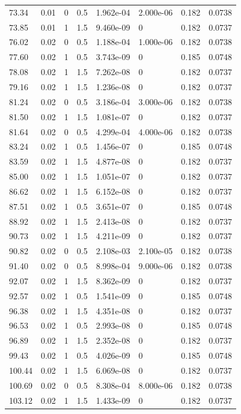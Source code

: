 \documentclass[preview]{standalone}
\begin{document}
{{{\begin{tabular}{L{1.2cm}C{1.2cm} C{0.3cm}C{0.5cm} C{1.4cm}C{1.4cm} C{1.4cm}C{1.4cm}}
  73.34  &  0.01  & 0     & 0.5 &  1.962e-04  & 2.000e-06  & 0.182 &  0.0738   \\ 
  73.85  &  0.01  & 1     & 1.5 &  9.460e-09  & 0  & 0.182 &  0.0737   \\ 
  76.02  &  0.02  & 0     & 0.5 &  1.188e-04  & 1.000e-06  & 0.182 &  0.0738   \\ 
  77.60  &  0.02  & 1     & 0.5 &  3.743e-09  & 0  & 0.185 &  0.0748   \\ 
  78.08  &  0.02  & 1     & 1.5 &  7.262e-08  & 0  & 0.182 &  0.0737   \\ 
  79.16  &  0.02  & 1     & 1.5 &  1.236e-08  & 0  & 0.182 &  0.0737   \\ 
  81.24  &  0.02  & 0     & 0.5 &  3.186e-04  & 3.000e-06  & 0.182 &  0.0738   \\ 
  81.50  &  0.02  & 1     & 1.5 &  1.081e-07  & 0  & 0.182 &  0.0737   \\ 
  81.64  &  0.02  & 0     & 0.5 &  4.299e-04  & 4.000e-06  & 0.182 &  0.0738   \\ 
  83.24  &  0.02  & 1     & 0.5 &  1.456e-07  & 0  & 0.185 &  0.0748   \\ 
  83.59  &  0.02  & 1     & 1.5 &  4.877e-08  & 0  & 0.182 &  0.0737   \\ 
  85.00  &  0.02  & 1     & 1.5 &  1.051e-07  & 0  & 0.182 &  0.0737   \\ 
  86.62  &  0.02  & 1     & 1.5 &  6.152e-08  & 0  & 0.182 &  0.0737   \\ 
  87.51  &  0.02  & 1     & 0.5 &  3.651e-07  & 0  & 0.185 &  0.0748   \\ 
  88.92  &  0.02  & 1     & 1.5 &  2.413e-08  & 0  & 0.182 &  0.0737   \\ 
  90.73  &  0.02  & 1     & 1.5 &  4.211e-09  & 0  & 0.182 &  0.0737   \\ 
  90.82  &  0.02  & 0     & 0.5 &  2.108e-03  & 2.100e-05  & 0.182 &  0.0738   \\ 
  91.40  &  0.02  & 0     & 0.5 &  8.998e-04  & 9.000e-06  & 0.182 &  0.0738   \\ 
  92.07  &  0.02  & 1     & 1.5 &  8.362e-09  & 0  & 0.182 &  0.0737   \\ 
  92.57  &  0.02  & 1     & 0.5 &  1.541e-09  & 0  & 0.185 &  0.0748   \\ 
  96.38  &  0.02  & 1     & 1.5 &  4.351e-08  & 0  & 0.182 &  0.0737   \\ 
  96.53  &  0.02  & 1     & 0.5 &  2.993e-08  & 0  & 0.185 &  0.0748   \\ 
  96.89  &  0.02  & 1     & 1.5 &  2.352e-08  & 0  & 0.182 &  0.0737   \\ 
  99.43  &  0.02  & 1     & 0.5 &  4.026e-09  & 0  & 0.185 &  0.0748   \\ 
  100.44  &  0.02  & 1     & 1.5 &  6.069e-08  & 0  & 0.182 &  0.0737   \\ 
  100.69  &  0.02  & 0     & 0.5 &  8.308e-04  & 8.000e-06  & 0.182 &  0.0738   \\ 
  103.12  &  0.02  & 1     & 1.5 &  1.433e-09  & 0  & 0.182 &  0.0737   \\ 
\hline 
\end{tabular} 

}}}
\end{document}
